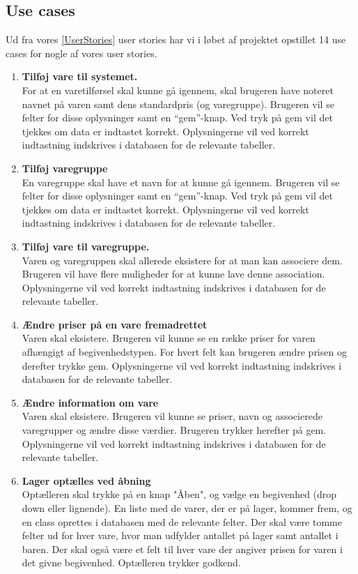 \documentclass[]{article}
\begin{document}
\subsection{Use cases}

Ud fra vores \ref{UserStories} user stories har vi i løbet af projektet opstillet 14 use cases for nogle af vores user stories.
\begin{enumerate} [label= \# \arabic*:]
	\item  \textbf{Tilføj vare til systemet.} \\For at en varetilførsel skal kunne gå igennem, skal brugeren have noteret navnet på varen samt dens standardpris (og varegruppe). Brugeren vil se felter for disse oplysninger samt en “gem”-knap. Ved tryk på gem vil det tjekkes om data er indtastet korrekt. Oplysningerne vil ved korrekt indtastning indskrives i databasen for de relevante tabeller.
	\item \textbf{Tilføj varegruppe} \\En varegruppe skal have et navn for at kunne gå igennem. Brugeren vil se felter for disse oplysninger samt en “gem”-knap. Ved tryk på gem vil det tjekkes om data er indtastet korrekt. Oplysningerne vil ved korrekt indtastning indskrives i databasen for de relevante tabeller.
	\item \textbf{Tilføj vare til varegruppe.}\\Varen og varegruppen skal allerede eksistere for at man kan associere dem. Brugeren vil have flere muligheder for at kunne lave denne association. Oplysningerne vil ved korrekt indtastning indskrives i databasen for de relevante tabeller.
	\item \textbf{Ændre priser på en vare fremadrettet}\\Varen skal eksistere. Brugeren vil kunne se en række priser for varen afhængigt af begivenhedstypen. For hvert felt kan brugeren ændre prisen og derefter trykke gem. Oplysningerne vil ved korrekt indtastning indskrives i databasen for de relevante tabeller.
	\item \textbf{Ændre information om vare}\\Varen skal eksistere. Brugeren vil kunne se priser, navn og associerede varegrupper og ændre disse værdier. Brugeren trykker herefter på gem. Oplysningerne vil ved korrekt indtastning indskrives i databasen for de relevante tabeller.
	\item  \textbf{Lager optælles ved åbning} \\Optælleren skal trykke på en knap "Åben", og vælge en begivenhed (drop down eller lignende). En liste med de varer, der er på lager, kommer frem, og en class oprettes i databasen med de relevante felter. Der skal være tomme felter ud for hver vare, hvor man udfylder antallet på lager samt antallet i baren. Der skal også være et felt til hver vare der angiver prisen for varen i det givne begivenhed. Optælleren trykker godkend. 

\end{enumerate}
\end{document}
